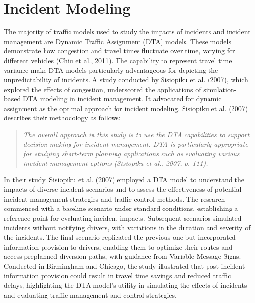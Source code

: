 \documentclass[fancy, oneside, mastersfancy, ms]{byuthesis}
\begin{document}
\hypertarget{sec-inc_modeling}{%
\section{Incident Modeling}\label{sec-inc_modeling}}

The majority of traffic models used to study the impacts of incidents
and incident management are Dynamic Traffic Assignment (DTA) models.
These models demonstrate how congestion and travel times fluctuate over
time, varying for different vehicles (Chiu et al., 2011). The capability
to represent travel time variance make DTA models particularly
advantageous for depicting the unpredictability of incidents. A study
conducted by Sisiopiku et al. (2007), which explored the effects of
congestion, underscored the applications of simulation-based DTA
modeling in incident management. It advocated for dynamic assignment as
the optimal approach for incident modeling. Sisiopiku et al. (2007)
describes their methodology as follows:

\begin{quote}
\emph{The overall approach in this study is to use the DTA capabilities
to support decision-making for incident management. DTA is particularly
appropriate for studying short-term planning applications such as
evaluating various incident management options (Sisiopiku et al., 2007,
p. 111).}
\end{quote}

In their study, Sisiopiku et al. (2007) employed a DTA model to
understand the impacts of diverse incident scenarios and to assess the
effectiveness of potential incident management strategies and traffic
control methods. The research commenced with a baseline scenario under
standard conditions, establishing a reference point for evaluating
incident impacts. Subsequent scenarios simulated incidents without
notifying drivers, with variations in the duration and severity of the
incidents. The final scenario replicated the previous one but
incorporated information provision to drivers, enabling them to optimize
their routes and access preplanned diversion paths, with guidance from
Variable Message Signs. Conducted in Birmingham and Chicago, the study
illustrated that post-incident information provision could result in
travel time savings and reduced traffic delays, highlighting the DTA
model's utility in simulating the effects of incidents and evaluating
traffic management and control strategies.
\end{document}
